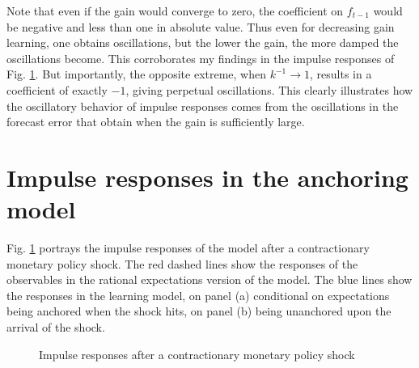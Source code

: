 \documentclass[11pt]{article}
\def \myFigPath {../../figures/}
\renewcommand{\[}{\begin{equation}}
\renewcommand{\]}{\end{equation}}
\def\mySmallerFigScale{0.18}
\begin{document}
Note that even if the gain would converge to zero, the coefficient on $f_{t-1}$ would be negative and less than one in absolute value. Thus even for decreasing gain learning, one obtains oscillations, but the lower the gain, the more damped the oscillations become. This corroborates my findings in the impulse responses of Fig. \ref{IRF}. But importantly, the opposite extreme, when $k^{-1}\rightarrow 1$, results in a coefficient of exactly $-1$, giving perpetual oscillations. This clearly illustrates how the oscillatory behavior of impulse responses comes from the oscillations in the forecast error that obtain when the gain is sufficiently large. 

\section{Impulse responses in the anchoring model}\label{app_IRFs}
Fig. \ref{IRF} portrays the impulse responses of the model after a contractionary monetary policy shock. The red dashed lines show the responses of the observables in the rational expectations version of the model. The blue lines show the responses in the learning model, on panel (a) conditional on expectations being anchored when the shock hits, on panel (b) being unanchored upon the arrival of the shock. 

\begin{figure}[h!]
\caption{Impulse responses after a contractionary monetary policy shock}
\label{IRF}
\end{figure}
\end{document}
